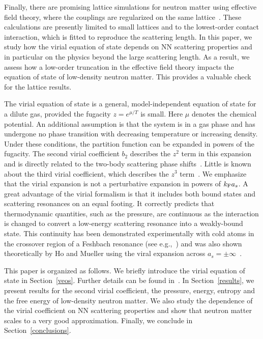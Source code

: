 \documentclass[aps,prc,twocolumn,showpacs,showkeys,amsmath,amssymb]{revtex4}
\newcommand{\kf}{k_{\rm F}}
\newcommand{\as}{a_s}
\begin{document}
Finally, there are promising lattice simulations for neutron matter 
using effective field theory, where the couplings are regularized on 
the same lattice~\cite{Dean}. These calculations are presently limited 
to small lattices and to the lowest-order contact interaction, which is 
fitted to reproduce the scattering length. In this paper, we study
how the virial equation of state depends on NN scattering properties 
and in particular on the physics beyond the large scattering length. 
As a result, we assess how a low-order truncation in the effective field 
theory impacts the equation of state of low-density neutron matter. 
This provides a valuable check for the lattice results.

The virial equation of state is a general, model-independent equation of state 
for a dilute gas, provided the fugacity $z = e^{\mu/T}$ is small. Here $\mu$ 
denotes the chemical potential. An additional assumption is that the 
system is in a gas phase and has undergone no phase transition with 
decreasing temperature or increasing density. Under these conditions,
the partition function can be expanded in powers of the fugacity.
The second virial coefficient $b_2$ describes the $z^2$ term in this
expansion and is directly related to the two-body scattering phase 
shifts~\cite{b2,huang}. Little is known about the third virial 
coefficient, which describes the $z^3$ term~\cite{b3Pais,b3Bedaque}. 
We emphasize that the virial expansion is not a perturbative
expansion in powers of $\kf \as$. A great advantage of the virial 
formalism is that it includes both bound states and scattering resonances 
on an equal footing. It correctly predicts that thermodynamic
quantities, such as the pressure, are continuous as the interaction is
changed to convert a low-energy scattering resonance into a weakly-bound
state. This continuity has been demonstrated experimentally with cold atoms 
in the crossover region of a Feshbach resonance (see e.g.,~\cite{Salomon}) 
and was also shown theoretically by Ho and Mueller using the viral
expansion across $\as = \pm \infty$~\cite{Ho1}.

This paper is organized as follows. We briefly introduce the virial 
equation of state in Section~\ref{veos}. Further details can be found
in~\cite{vEOSnuc}. In Section~\ref{results}, we present results for
the second virial coefficient, the pressure, energy, entropy and the free
energy of low-density neutron matter. 
We also study the dependence of the virial 
coefficient on NN scattering properties and show that neutron matter 
scales to a very good approximation. Finally, we conclude in 
Section~\ref{conclusions}.
\end{document}
